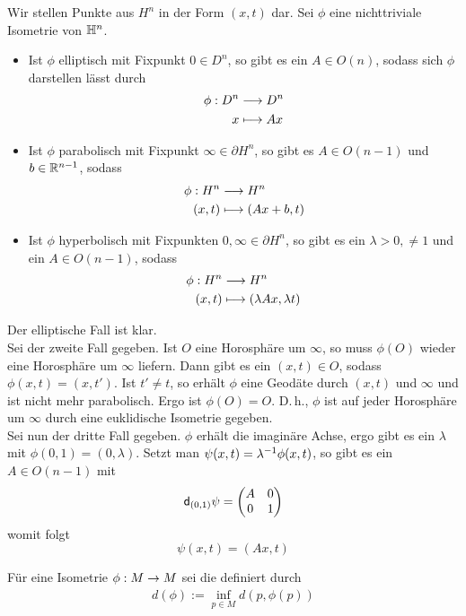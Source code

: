 \documentclass{book}
\renewcommand{\d}{\textsf{d}}
\begin{document}
\Prop{}
Wir stellen Punkte aus $H^n$ in der Form $(x,t)$ dar. Sei $\phi$ eine nichttriviale Isometrie von $\mathbb{H}^n$.
\begin{itemize}
	\item Ist $\phi$ elliptisch mit Fixpunkt $0 \in D^n$, so gibt es ein $A \in O(n)$, sodass sich $\phi$ darstellen lässt durch
	\begin{align*}
\phi:	D^n & \overset{}{\longrightarrow} D^n\\
	x & \longmapsto Ax
	\end{align*}
	\item Ist $\phi$ parabolisch mit Fixpunkt $\infty \in \partial H^n$, so gibt es $A \in O(n-1)$ und $b\in \mathbb{R}^{n-1}$, sodass
	\begin{align*}
\phi:	H^n & \overset{}{\longrightarrow} H^n\\
	(x,t) & \longmapsto (Ax + b, t)
	\end{align*}
	\item Ist $\phi$ hyperbolisch mit Fixpunkten $0,\infty \in \partial H^n$, so gibt es ein $\lambda > 0, \neq 1$ und ein $A\in O(n-1)$, sodass
		\begin{align*}
	\phi:	H^n & \overset{}{\longrightarrow} H^n\\
	(x,t) & \longmapsto (\lambda Ax, \lambda t)
	\end{align*}
\end{itemize}
\begin{Beweis}{}
Der elliptische Fall ist klar.\\
Sei der zweite Fall gegeben. Ist $O$ eine Horosphäre um $\infty$, so muss $\phi(O)$ wieder eine Horosphäre um $\infty$ liefern. Dann gibt es ein $(x,t) \in O$, sodass $\phi(x,t) = (x, t')$. Ist $t' \neq t$, so erhält $\phi$ eine Geodäte durch $(x,t)$ und $\infty$ und ist nicht mehr parabolisch. Ergo ist $\phi(O) = O$. D.\,h., $\phi$ ist auf jeder Horosphäre um $\infty$ durch eine euklidische Isometrie gegeben.\\
Sei nun der dritte Fall gegeben. $\phi$ erhält die imaginäre Achse, ergo gibt es ein $\lambda$ mit $\phi(0,1) = (0, \lambda)$. Setzt man $\psi(x,t) = \lambda^{-1} \phi(x,t)$, so gibt es ein $A\in O(n-1)$ mit
\[ \d_{(0,1)} \psi = \klam{
\begin{matrix}
A & 0\\
0 & 1
\end{matrix}
} \]
womit folgt
\[ \psi(x,t) = (Ax,t) \]
\end{Beweis}

\Def{}
Für eine Isometrie $\phi : M \overset{}{\rightarrow} M$ sei die  definiert durch
\begin{align*}
d(\phi) := \inf_{p\in M}d(p, \phi(p))
\end{align*}
\end{document}

